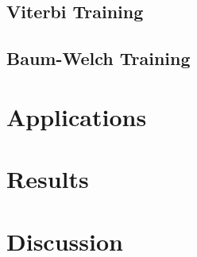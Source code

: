 \documentclass{article}
\begin{document}
\subsection{Viterbi Training}

\subsection{Baum-Welch Training}


\section{Applications}

\section{Results}

\section{Discussion}


% 
% 
% 



% 
\end{document}
